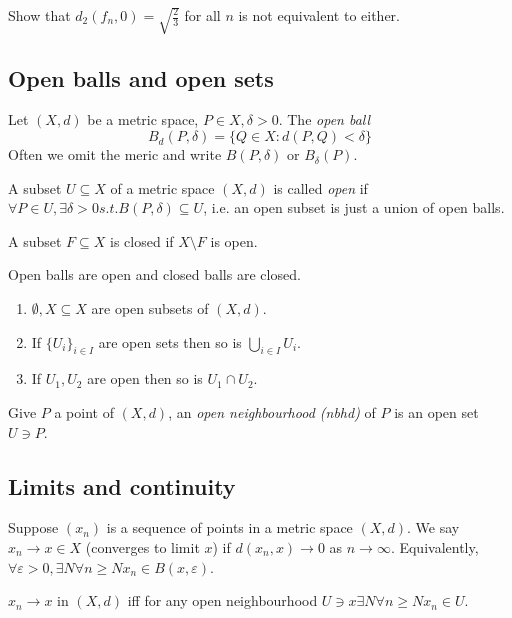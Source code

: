 \documentclass[a4paper]{article}
\begin{document}
\begin{center}
\end{center}

\begin{ex}
  Show that $d_2(f_n,0) = \sqrt{\frac{2}{3}}$ for all $n$ is not equivalent to either.
\end{ex}

\subsection{Open balls and open sets}

Let $(X,d)$ be a metric space, $P\in X, \delta > 0$. The \emph{open ball}
\[
  B_d(P,\delta) = \{Q\in X: d(P,Q) < \delta\}
\]
Often we omit the meric and write $B(P,\delta)$ or $B_\delta(P)$.

\begin{definition}
  A subset $U \subseteq X$ of a metric space $(X,d)$ is called \emph{open} if $\forall P \in U, \exists \delta>0 s.t. B(P,\delta)\subseteq U$, i.e. an open subset is just a union of open balls.

  A subset $F\subseteq X$ is closed if $X\setminus F$ is open.
\end{definition}

Open balls are open and closed balls are closed.

\begin{lemma}\leavevmode
  \begin{enumerate}
  \item $\emptyset, X \subseteq X$ are open subsets of $(X,d)$.
  \item If $\{U_i\}_{i\in I}$ are open sets then so is $\bigcup_{i\in I} U_i$.
    \item If $U_1, U_2$ are open then so is $U_1 \cap U_2$.
  \end{enumerate}
\end{lemma}

\begin{definition}
  Give $P$ a point of $(X,d)$, an \emph{open neighbourhood (nbhd)} of $P$ is an open set $U \ni P$.
\end{definition}

\subsection{Limits and continuity}

Suppose $(x_n)$ is a sequence of points in a metric space $(X,d)$. We say $x_n \to x\in X$ (converges to limit $x$) if $d(x_n,x) \to 0$ as $n \to \infty$. Equivalently, $\forall \varepsilon>0, \exists N \forall n\geq N x_n \in B(x, \varepsilon)$.

\begin{remark}
  $x_n \to x$ in $(X,d)$ iff for any open neighbourhood $U \ni x \exists N \forall n\geq N x_n \in U$. 
\end{remark}
\end{document}
